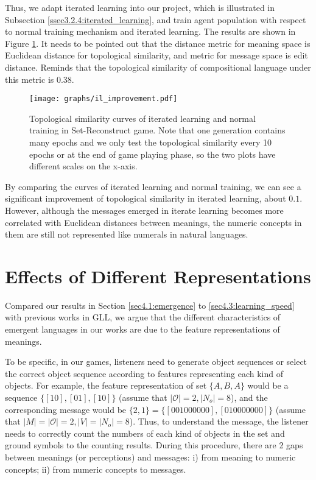 Thus, we adapt iterated learning into our project, which is illustrated in Subsection \ref{ssec3.2.4:iterated_learning}, and train agent population with respect to normal training mechanism and iterated learning. The results are shown in Figure \ref{fig4.4:il_improve}. It needs to be pointed out that the distance metric for meaning space is Euclidean distance for topological similarity, and metric for message space is edit distance. Reminds that the topological similarity of compositional language under this metric is 0.38.

\begin{figure}[!h]
    \centering
    \texttt{[image: graphs/il\_improvement.pdf]}
    \caption{Topological similarity curves of iterated learning and normal training in Set-Reconstruct game. Note that one generation contains many epochs and we only test the topological similarity every 10 epochs or at the end of game playing phase, so the two plots have different scales on the x-axis.}
    \label{fig4.4:il_improve}
\end{figure}

By comparing the curves of iterated learning and normal training, we can see a significant improvement of topological similarity in iterated learning, about $0.1$. However, although the messages emerged in iterate learning becomes more correlated with Euclidean distances between meanings, the numeric concepts in them are still not represented like numerals in natural languages.


\section{Effects of Different Representations}
\label{sec4.4:represent_effect}

Compared our results in Section \ref{sec4.1:emergence} to \ref{sec4.3:learning_speed} with previous works in GLL, we argue that the different characteristics of emergent languages in our works are due to the feature representations of meanings.

To be specific, in our games, listeners need to generate object sequences or select the correct object sequence according to features representing each kind of objects. For example, the feature representation of set $\{A, B, A\}$ would be a sequence $\{[1 0], [0 1], [1 0]\}$ (assume that $|\mathcal{O}|=2, |N_o|=8$), and the corresponding message would be $\{2, 1\}=\{[0 0 1 0 0 0 0 0 0], [0 1 0 0 0 0 0 0 0]\}$ (assume that $|M|=|\mathcal{O}|=2, |V|=|N_o|=8$). Thus, to understand the message, the listener needs to correctly count the numbers of each kind of objects in the set and ground symbols to the counting results. During this procedure, there are 2 gaps between meanings (or perceptions) and messages: i) from meaning to numeric concepts; ii) from numeric concepts to messages.

